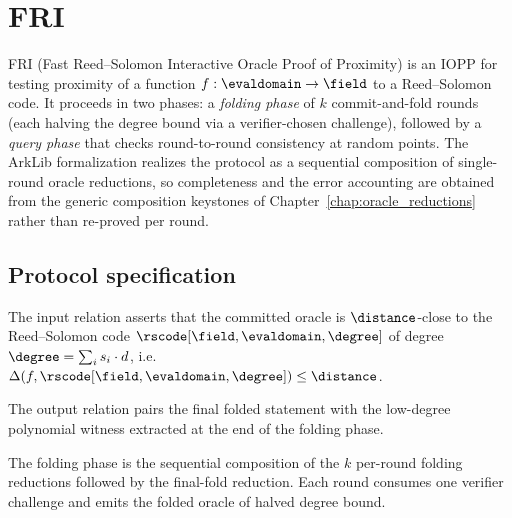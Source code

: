 
\section{FRI}\label{sec:fri}

FRI (Fast Reed--Solomon Interactive Oracle Proof of Proximity) is an IOPP for testing proximity
of a function $f : \evaldomain \to \field$ to a Reed--Solomon code. It proceeds in two phases: a
\emph{folding phase} of $k$ commit-and-fold rounds (each halving the degree bound via a
verifier-chosen challenge), followed by a \emph{query phase} that checks round-to-round
consistency at random points. The ArkLib formalization realizes the protocol as a sequential
composition of single-round oracle reductions, so completeness and the error accounting are
obtained from the generic composition keystones of
Chapter~\ref{chap:oracle_reductions} rather than re-proved per round.

\subsection{Protocol specification}\label{sec:fri_spec}

\begin{definition}\label{def:fri_input_relation}
    The input relation asserts that the committed oracle is $\distance$-close to the
    Reed--Solomon code $\rscode[\field,\evaldomain,\degree]$ of degree
    $\degree = \sum_{i} s_i \cdot d$, i.e. $\Delta(f,\rscode[\field,\evaldomain,\degree]) \le
    \distance$.
\end{definition}

\begin{definition}\label{def:fri_output_relation}
    The output relation pairs the final folded statement with the low-degree polynomial witness
    extracted at the end of the folding phase.
\end{definition}

\begin{definition}\label{def:fri_reduction_fold}
    The folding phase is the sequential composition of the $k$ per-round folding reductions
    followed by the final-fold reduction. Each round consumes one verifier challenge and emits the
    folded oracle of halved degree bound.
\end{definition}

